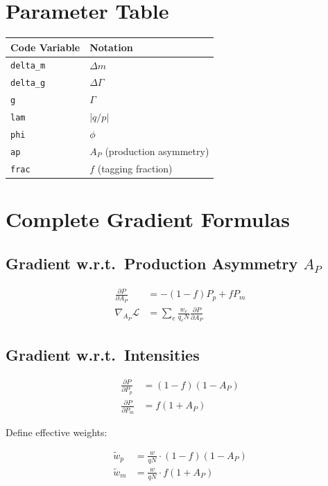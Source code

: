\documentclass[12pt,a4paper]{article}
\begin{document}
\section{Parameter Table}

\begin{table}[h]
\centering
\begin{tabular}{ll}
\hline
Code Variable & Notation \\
\hline
\texttt{delta\_m} & $\Delta m$ \\
\texttt{delta\_g} & $\Delta\Gamma$ \\
\texttt{g} & $\Gamma$ \\
\texttt{lam} & $|q/p|$ \\
\texttt{phi} & $\phi$ \\
\texttt{ap} & $A_P$ (production asymmetry) \\
\texttt{frac} & $f$ (tagging fraction) \\
\hline
\end{tabular}
\end{table}

\newpage
\section{Complete Gradient Formulas}

\subsection{Gradient w.r.t.\ Production Asymmetry $A_P$}

\begin{align}
\frac{\partial P}{\partial A_P} &= -(1-f) P_p + f P_m \\
\nabla_{A_P} \mathcal{L} &= \sum_e \frac{w_e}{q_e N} \frac{\partial P}{\partial A_P}
\end{align}

\subsection{Gradient w.r.t.\ Intensities}

\begin{align}
\frac{\partial P}{\partial P_p} &= (1-f)(1-A_P) \\
\frac{\partial P}{\partial P_m} &= f(1+A_P)
\end{align}

Define effective weights:

\begin{align}
\tilde{w}_p &= \frac{w}{q N} \cdot (1-f)(1-A_P) \\
\tilde{w}_m &= \frac{w}{q N} \cdot f(1+A_P)
\end{align}
\end{document}
